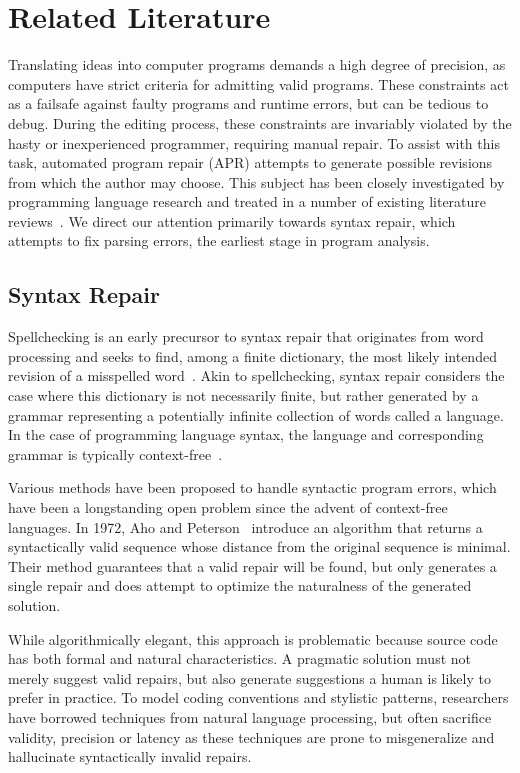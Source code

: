 \chapter{\rm\bfseries Related Literature}
\label{ch:litreview}

Translating ideas into computer programs demands a high degree of precision, as computers have strict criteria for admitting valid programs. These constraints act as a failsafe against faulty programs and runtime errors, but can be tedious to debug. During the editing process, these constraints are invariably violated by the hasty or inexperienced programmer, requiring manual repair. To assist with this task, automated program repair (APR) attempts to generate possible revisions from which the author may choose. This subject has been closely investigated by programming language research and treated in a number of existing literature reviews~\cite{monperrus2018living, le2021automatic}. We direct our attention primarily towards syntax repair, which attempts to fix parsing errors, the earliest stage in program analysis.

\section{Syntax Repair}

Spellchecking is an early precursor to syntax repair that originates from word processing and seeks to find, among a finite dictionary, the most likely intended revision of a misspelled word~\cite{kernighan1990spelling}. Akin to spellchecking, syntax repair considers the case where this dictionary is not necessarily finite, but rather generated by a grammar representing a potentially infinite collection of words called a language. In the case of programming language syntax, the language and corresponding grammar is typically context-free~\cite{chomsky1959algebraic}.

Various methods have been proposed to handle syntactic program errors, which have been a longstanding open problem since the advent of context-free languages. In 1972, Aho and Peterson~\cite{aho1972minimum} introduce an algorithm that returns a syntactically valid sequence whose distance from the original sequence is minimal. Their method guarantees that a valid repair will be found, but only generates a single repair and does attempt to optimize the naturalness of the generated solution.

While algorithmically elegant, this approach is problematic because source code has both formal and natural characteristics. A pragmatic solution must not merely suggest valid repairs, but also generate suggestions a human is likely to prefer in practice. To model coding conventions and stylistic patterns, researchers have borrowed techniques from natural language processing, but often sacrifice validity, precision or latency as these techniques are prone to misgeneralize and hallucinate syntactically invalid repairs.


